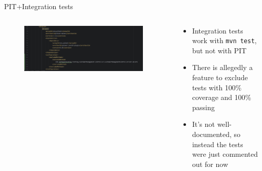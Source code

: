 \documentclass[compress,aspectratio=169]{beamer}
\begin{document}
 	\begin{frame}{PIT+Integration tests}
    \begin{columns}
      \begin{column}{0.5\textwidth}
        \begin{figure}
          \begin{center}
            \includegraphics[width=0.95\textwidth]{excludedmethod.png}
          \end{center}
        \end{figure}
      \end{column}
      \begin{column}{0.5\textwidth}
        \begin{itemize}
                \item Integration tests work with \texttt{mvn test}, but not with PIT
                \item There is allegedly a feature to exclude tests with 100\% coverage and 100\% passing
                \item It's not well-documented, so instead the tests were just commented out for now
        \end{itemize}
      \end{column}
    \end{columns}
	\end{frame}
\end{document}

